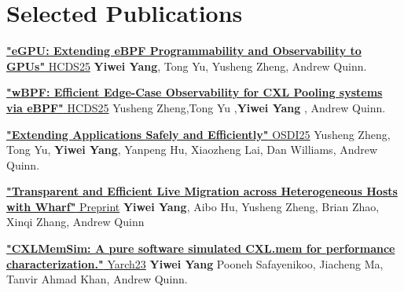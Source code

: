 \documentclass{resume}
\newcommand{\en}[1]{#1}
\newcommand{\zh}[1]{}
\begin{document}
\section{\en{Selected Publications}\zh{主要论文}}

\href{https://dl.acm.org/doi/10.1145/3723851.3726984}{\textbf{"eGPU: Extending eBPF Programmability and Observability to GPUs"} HCDS25} \textbf{Yiwei Yang}, Tong Yu, Yusheng Zheng, Andrew Quinn.

\href{https://dl.acm.org/doi/10.1145/3723851.3726985}{\textbf{"wBPF: Efficient Edge-Case Observability for CXL Pooling systems via eBPF"} HCDS25} Yusheng Zheng,Tong Yu ,\textbf{Yiwei Yang} , Andrew Quinn.

\href{https://arxiv.org/pdf/2311.07923}{\textbf{"Extending Applications Safely and Efficiently"} OSDI25} Yusheng Zheng, Tong Yu, \textbf{Yiwei Yang}, Yanpeng Hu, Xiaozheng Lai, Dan Williams, Andrew Quinn.

\href{https://arxiv.org/pdf/2410.15894}{\textbf{"Transparent and Efficient Live Migration across Heterogeneous Hosts with Wharf"} Preprint} \textbf{Yiwei Yang}, Aibo Hu, Yusheng Zheng, Brian Zhao, Xinqi Zhang, Andrew Quinn


\href{https://arxiv.org/pdf/2303.06153}{\textbf{"CXLMemSim: A pure software simulated CXL.mem for performance characterization."} Yarch23} \textbf{Yiwei Yang} Pooneh Safayenikoo, Jiacheng Ma, Tanvir Ahmad Khan, Andrew Quinn.

      
\end{document}
